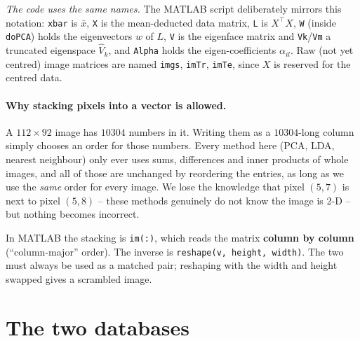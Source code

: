 \documentclass[11pt]{article}
\theoremstyle{definition}
\theoremstyle{remark}
\begin{document}
\medskip
\noindent\emph{The code uses the same names.} The MATLAB script deliberately
mirrors this notation: \texttt{xbar} is $\bar{x}$, \texttt{X} is the
mean-deducted data matrix, \texttt{L} is $X^{\!\top}\!X$, \texttt{W} (inside
\texttt{doPCA}) holds the eigenvectors $w$ of $L$, \texttt{V} is the eigenface
matrix and \texttt{Vk}/\texttt{Vm} a truncated eigenspace $\hat{V}_k$, and
\texttt{Alpha} holds the eigen-coefficients $\alpha_{il}$. Raw (not yet centred)
image matrices are named \texttt{imgs}, \texttt{imTr}, \texttt{imTe}, since
$X$ is reserved for the centred data.

\paragraph{Why stacking pixels into a vector is allowed.}
A $112\times 92$ image has $10304$ numbers in it. Writing them as a $10304$-long
column simply chooses an order for those numbers. Every method here (PCA, LDA,
nearest neighbour) only ever uses sums, differences and inner products of whole
images, and all of those are unchanged by reordering the entries, as long as we use
the \emph{same} order for every image. We lose the knowledge that pixel $(5,7)$ is
next to pixel $(5,8)$ -- these methods genuinely do not know the image is 2-D --
but nothing becomes incorrect.

\medskip
In MATLAB the stacking is \texttt{im(:)}, which reads the matrix \textbf{column by
column} (``column-major'' order). The inverse is
\texttt{reshape(v, height, width)}. The two must always be used as a matched pair;
reshaping with the width and height swapped gives a scrambled image.

\section{The two databases}
\end{document}
